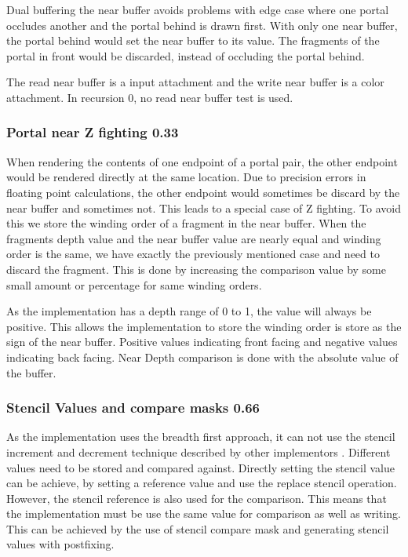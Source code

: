 Dual buffering \cite{lowe:2005:technique} the near buffer avoids problems with edge case where one portal occludes another and the portal behind is drawn first. With only one near buffer, the portal behind would set the near buffer to its value. The fragments of the portal in front would be discarded, instead of occluding the portal behind.

The read near buffer is a input attachment and the write near buffer is a color attachment. In recursion 0, no read near buffer test is used.

\subsubsection{Portal near Z fighting 0.33}
\label{section:portalzfighting}
When rendering the contents of one endpoint of a portal pair, the other endpoint would be rendered directly at the same location. Due to precision errors in floating point calculations, the other endpoint would sometimes be discard by the near buffer and sometimes not. This leads to a special case of Z fighting. To avoid this we store the winding order of a fragment in the near buffer. When the fragments depth value and the near buffer value are nearly equal and winding order is the same, we have exactly the previously mentioned case and need to discard the fragment. This is done by increasing the comparison value by some small amount or percentage for same winding orders.

As the implementation has a depth range of 0 to 1, the value will always be positive. This allows the implementation to store the winding order is store as the sign of the near buffer. Positive values indicating front facing and negative values indicating back facing. Near Depth comparison is done with the absolute value of the buffer.

\subsubsection{Stencil Values and compare masks 0.66}
\label{section:stencilcomparemasks}

As the implementation uses the breadth first approach, it can not use the stencil increment and decrement technique described by other implementors \cite{schmalstieg:1999:sewing, lowe:2003:fragment, lecture:portalProblems}. Different values need to be stored and compared against. Directly setting the stencil value can be achieve, by setting a reference value and use the replace stencil operation. However, the stencil reference is also used for the comparison. This means that the implementation must be use the same value for comparison as well as writing. This can be achieved by the use of stencil compare mask and generating stencil values with postfixing.

